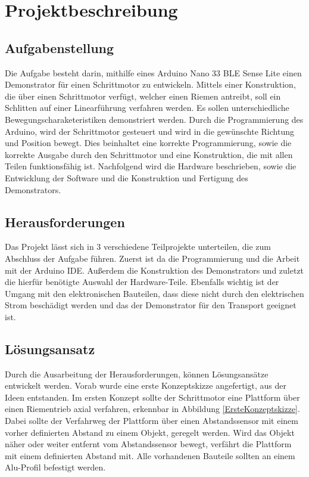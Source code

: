 

\chapter{Projektbeschreibung}

\section{Aufgabenstellung}

Die Aufgabe besteht darin, mithilfe eines Arduino Nano 33 BLE Sense Lite einen Demonstrator für einen Schrittmotor zu entwickeln. Mittels einer Konstruktion, die über einen Schrittmotor verfügt, welcher einen Riemen antreibt, soll ein Schlitten auf einer Linearführung verfahren werden. Es sollen unterschiedliche Bewegungscharaketeristiken demonstriert werden. Durch die Programmierung des Arduino, wird der Schrittmotor gesteuert und wird in die gewünschte Richtung und Position bewegt. Dies beinhaltet eine korrekte Programmierung, sowie die korrekte Ausgabe durch den Schrittmotor und eine Konstruktion, die mit allen Teilen funktionsfähig ist. Nachfolgend wird die Hardware beschrieben, sowie die Entwicklung der Software und die Konstruktion und Fertigung des Demonstrators.

\section{Herausforderungen}

Das Projekt lässt sich in 3 verschiedene Teilprojekte unterteilen, die zum Abschluss der Aufgabe führen. Zuerst ist da die Programmierung und die Arbeit mit der Arduino IDE. Außerdem die Konstruktion des Demonstrators und zuletzt die hierfür benötigte Auswahl der Hardware-Teile. Ebenfalls wichtig ist der Umgang mit den elektronischen Bauteilen, dass diese nicht durch den elektrischen Strom beschädigt werden und das der Demonstrator für den Transport geeignet ist. 

\section{Lösungsansatz}
Durch die Ausarbeitung der Herausforderungen, können Lösungsansätze entwickelt werden. Vorab wurde eine erste Konzeptskizze angefertigt, aus der Ideen entstanden. Im ersten Konzept sollte der Schrittmotor eine Plattform über einen Riementrieb axial verfahren, erkennbar in Abbildung \ref{ErsteKonzeptskizze}. Dabei sollte der Verfahrweg der Plattform über einen Abstandssensor mit einem vorher definierten Abstand zu einem Objekt, geregelt werden. Wird das Objekt näher oder weiter entfernt vom Abstandssensor bewegt, verfährt die Plattform mit einem definierten Abstand mit. Alle vorhandenen Bauteile sollten an einem Alu-Profil befestigt werden.

